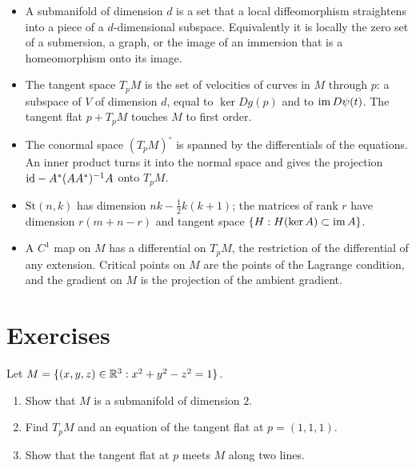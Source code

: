 \begin{notechapter}
\begin{chaptersummary}
\begin{itemize}[nosep]
  \item A submanifold of dimension $d$ is a set that a local
        diffeomorphism straightens into a piece of a $d$-dimensional
        subspace. Equivalently it is locally the zero set of a
        submersion, a graph, or the image of an immersion that is a
        homeomorphism onto its image.
  \item The tangent space $T_pM$ is the set of velocities of curves in
        $M$ through $p$: a subspace of $V$ of dimension $d$, equal to
        $\ker Dg(p)$ and to $\operatorname{im} D\psi(t)$. The tangent flat $p + T_pM$
        touches $M$ to first order.
  \item The conormal space $(T_pM)^\circ$ is spanned by the differentials
        of the equations. An inner product turns it into the normal
        space and gives the projection
        $\mathrm{id} - A^{*}(AA^{*})^{-1}A$ onto $T_pM$.
  \item $\mathrm{St}(n, k)$ has dimension $nk - \frac12k(k + 1)$; the
        matrices of rank $r$ have dimension $r(m + n - r)$ and tangent
        space $\{H : H(\ker A)\subset\operatorname{im} A\}$.
  \item A $C^1$ map on $M$ has a differential on $T_pM$, the restriction
        of the differential of any extension. Critical points on $M$ are
        the points of the Lagrange condition, and the gradient on $M$ is
        the projection of the ambient gradient.
\end{itemize}
\end{chaptersummary}

\section*{Exercises}

\begin{exercise}\label{submanifolds:exr:1}
Let $M = \{(x, y, z)\in\mathbb{R}^3 : x^2 + y^2 - z^2 = 1\}$.
\begin{enumerate}[nosep]
  \item Show that $M$ is a submanifold of dimension $2$.
  \item Find $T_pM$ and an equation of the tangent flat at
        $p = (1, 1, 1)$.
  \item Show that the tangent flat at $p$ meets $M$ along two lines.
\end{enumerate}
\end{exercise}


\end{notechapter}
